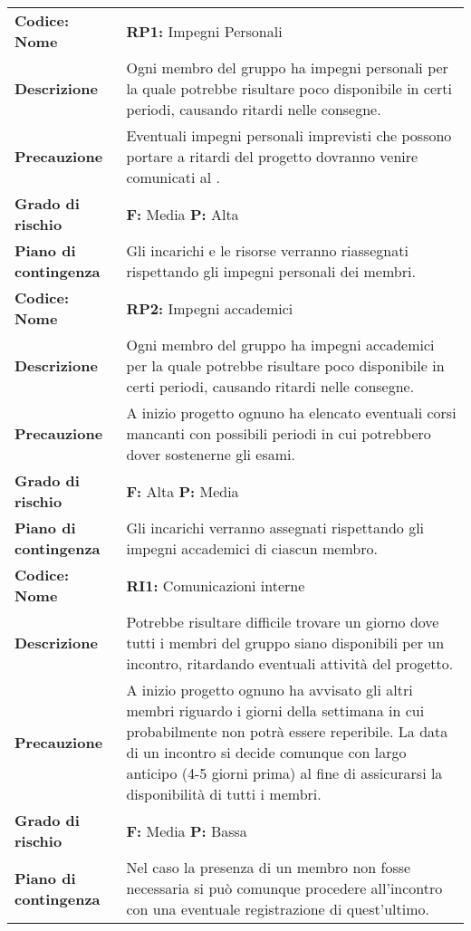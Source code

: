 {\begin{longtable}{C{3.5cm} | C{11cm}}
\textbf{Codice: Nome} & \textbf{RP1: }{Impegni Personali}\\
\textbf{Descrizione} & Ogni membro del gruppo ha impegni personali per la quale potrebbe risultare poco disponibile in certi periodi, causando ritardi nelle consegne.\\ 
\textbf{Precauzione} & Eventuali impegni personali imprevisti che possono portare a ritardi del progetto dovranno venire comunicati al \respProg{}.\\
\textbf{Grado di rischio} & \textbf{F: }Media \textbf{P: }Alta\\ 
\textbf{Piano di contingenza} & Gli incarichi e le risorse verranno riassegnati rispettando gli impegni personali dei membri.\\
\hline
\hline
{}\textbf{Codice: Nome} & \textbf{RP2: }{Impegni accademici}\\ 
\textbf{Descrizione} & Ogni membro del gruppo ha impegni accademici per la quale potrebbe risultare poco disponibile in certi periodi, causando ritardi nelle consegne.\\ 
\textbf{Precauzione} & A inizio progetto ognuno ha elencato eventuali corsi mancanti con possibili periodi in cui potrebbero dover sostenerne gli esami.\\
\textbf{Grado di rischio} & \textbf{F: }Alta \textbf{P: }Media\\
\textbf{Piano di contingenza} & Gli incarichi verranno assegnati rispettando gli impegni accademici di ciascun membro.\\
\hline

\textbf{Codice: Nome} & \textbf{RI1: }{Comunicazioni interne}\\
\textbf{Descrizione} & Potrebbe risultare difficile trovare un giorno dove tutti i membri del gruppo siano disponibili per un incontro, ritardando eventuali attività del progetto.\\ 
\textbf{Precauzione} & A inizio progetto ognuno ha avvisato gli altri membri riguardo i giorni della settimana in cui probabilmente non potrà essere reperibile. La data di un incontro si decide comunque con largo anticipo (4-5 giorni prima) al fine di assicurarsi la disponibilità di tutti i membri.\\
\textbf{Grado di rischio} & \textbf{F: }Media \textbf{P: }Bassa\\
\textbf{Piano di contingenza} & Nel caso la presenza di un membro non fosse necessaria si può comunque procedere all'incontro con una eventuale registrazione di quest'ultimo.\\
\hline


\end{longtable}}
